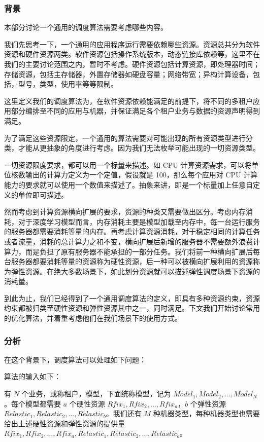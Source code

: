 \subsubsection{背景}

本部分讨论一个通用的调度算法需要考虑哪些内容。

我们先思考一下，一个通用的应用程序运行需要依赖哪些资源。资源总共分为软件资源和硬件资源两类。软件资源包括操作系统版本，动态链接库依赖等，这里不在我们的主要讨论范围之内，暂时不考虑。硬件资源包括计算资源，即处理器时间；存储资源，包括主存储器，外置存储器如硬盘容量；网络带宽；异构计算设备，包括，型号，类型，使用率等等限制。

这里定义我们的调度算法为，在软件资源依赖能满足的前提下，将不同的多租户应用部分编排至不同的应用与机器，并保证满足各个租户业务与数据的资源声明得到满足。

为了满足这些资源限定，一个通用的算法需要对可能出现的所有资源类型进行分类，才能从更抽象的角度进行考虑。因为我们无法枚举可能出现的一切资源类型。

一切资源限度要求，都可以用一个标量来描述。如 CPU 计算资源需求，可以将单位核数输出的计算力定义为一个定值，假设就是 100，那么每个应用对 CPU 计算能力的要求就可以使用一个数值来描述了。抽象来讲，即是一个标量加上任意自定义的单位即可描述。

然而考虑到计算资源横向扩展的要求，资源的种类又需要做出区分。考虑内存消耗，对于深度学习模型而言，内存消耗主要是模型加载至内存中，每一台运行服务的服务器都需要消耗等量的内存。再考虑计算资源消耗，对于稳定相同的计算任务或者流量，消耗的总计算力之和不变，横向扩展后新增的服务器不需要额外浪费计算力，而是负担了原有服务器不能承担的一部分任务。我们将前一种横向扩展后每台服务器都要消耗等量的资源称为硬性资源，后一种可以被横向扩展利用的资源称为弹性资源。在绝大多数场景下，如此划分资源就可以描述弹性调度场景下资源的消耗量。

到此为止，我们已经得到了一个通用调度算法的定义，即具有多种资源约束，资源约束都被归类至硬性资源和弹性资源其中之一，同时满足。下文我们开始讨论常用的优化算法，并着重考虑他们在我们场景下的使用方式。

\subsubsection{分析}

在这个背景下，调度算法可以处理如下问题：

算法的输入如下：

有 $N$ 个业务，或称租户，模型，下面统称模型，记为 $Model_1,Model_2,...,Model_N$。每个模型都需要 $a$ 个硬性资源 $Rfix_1,Rfix_2,...,Rfix_a$，$b$ 个弹性资源 $Relastic_1,Relastic_2,...,Relastic_b$。我们还有 $M$ 种机器类型，每种机器类型也需要给出上述硬性资源和弹性资源的提供量 $Rfix_1,Rfix_2,...,Rfix_a,Relastic_1,Relastic_2,...,Relastic_b$。


